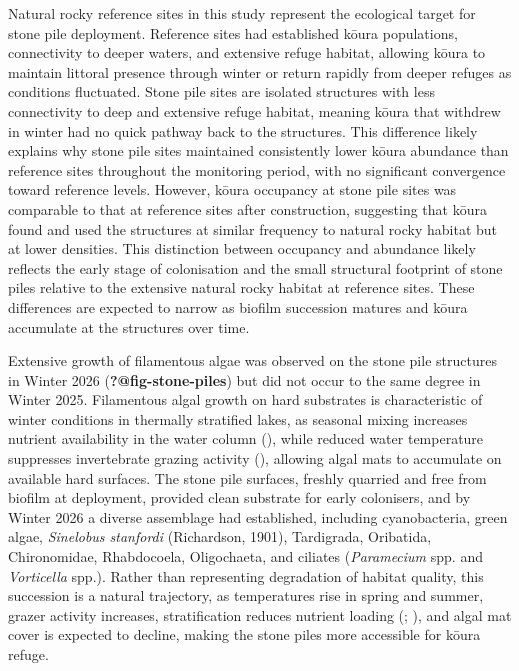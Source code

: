 \documentclass[
  letterpaper,
  DIV=11,
  numbers=noendperiod]{scrartcl}
\begin{document}
Natural rocky reference sites in this study represent the ecological
target for stone pile deployment. Reference sites had established kōura
populations, connectivity to deeper waters, and extensive refuge
habitat, allowing kōura to maintain littoral presence through winter or
return rapidly from deeper refuges as conditions fluctuated. Stone pile
sites are isolated structures with less connectivity to deep and
extensive refuge habitat, meaning kōura that withdrew in winter had no
quick pathway back to the structures. This difference likely explains
why stone pile sites maintained consistently lower kōura abundance than
reference sites throughout the monitoring period, with no significant
convergence toward reference levels. However, kōura occupancy at stone
pile sites was comparable to that at reference sites after construction,
suggesting that kōura found and used the structures at similar frequency
to natural rocky habitat but at lower densities. This distinction
between occupancy and abundance likely reflects the early stage of
colonisation and the small structural footprint of stone piles relative
to the extensive natural rocky habitat at reference sites. These
differences are expected to narrow as biofilm succession matures and
kōura accumulate at the structures over time.

Extensive growth of filamentous algae was observed on the stone pile
structures in Winter 2026 ({\textbf{?@fig-stone-piles}}) but did not
occur to the same degree in Winter 2025. Filamentous algal growth on
hard substrates is characteristic of winter conditions in thermally
stratified lakes, as seasonal mixing increases nutrient availability in
the water column (), while
reduced water temperature suppresses invertebrate grazing activity
(), allowing algal
mats to accumulate on available hard surfaces. The stone pile surfaces,
freshly quarried and free from biofilm at deployment, provided clean
substrate for early colonisers, and by Winter 2026 a diverse assemblage
had established, including cyanobacteria, green algae, \emph{Sinelobus
stanfordi} (Richardson, 1901), Tardigrada, Oribatida, Chironomidae,
Rhabdocoela, Oligochaeta, and ciliates (\emph{Paramecium} spp. and
\emph{Vorticella} spp.). Rather than representing degradation of habitat
quality, this succession is a natural trajectory, as temperatures rise
in spring and summer, grazer activity increases, stratification reduces
nutrient loading (;
), and algal mat cover is
expected to decline, making the stone piles more accessible for kōura
refuge.
\end{document}
